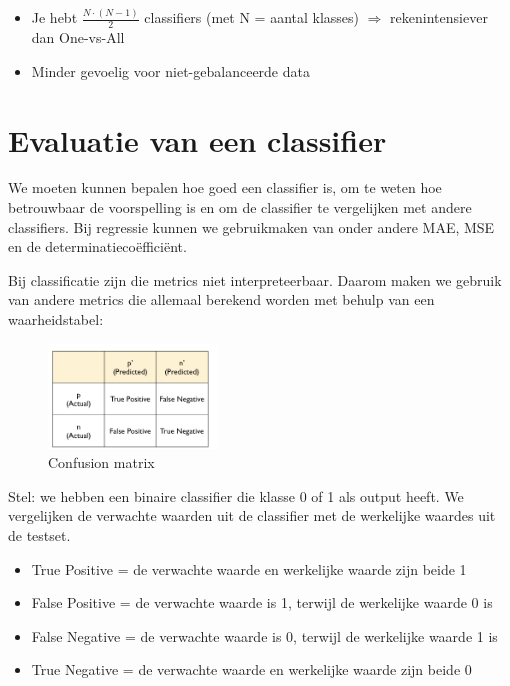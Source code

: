 \documentclass{article}
\begin{document}
\begin{itemize}
    \item Je hebt $\frac{N\cdot(N-1)}{2}$ classifiers (met N = aantal klasses) $\Rightarrow$ rekenintensiever dan One-vs-All
    \item Minder gevoelig voor niet-gebalanceerde data
\end{itemize}

\section{Evaluatie van een classifier}

We moeten kunnen bepalen hoe goed een classifier is, om te weten hoe betrouwbaar de voorspelling is
en om de classifier te vergelijken met andere classifiers. 
Bij regressie kunnen we gebruikmaken van onder andere MAE, MSE en de determinatiecoëfficiënt.
 
Bij classificatie zijn die metrics niet interpreteerbaar. 
Daarom maken we gebruik van andere metrics die allemaal berekend worden met behulp van een waarheidstabel:

\begin{figure}[H]
    \centering
    \includegraphics[width=0.4\textwidth]{truth-table.png}
    \caption{Confusion matrix}
\end{figure}

Stel: we hebben een binaire classifier die klasse 0 of 1 als output heeft.
We vergelijken de verwachte waarden uit de classifier met de werkelijke waardes uit de testset.

\begin{itemize}
    \item True Positive = de verwachte waarde en werkelijke waarde zijn beide 1
    \item False Positive = de verwachte waarde is 1, terwijl de werkelijke waarde 0 is
    \item False Negative = de verwachte waarde is 0, terwijl de werkelijke waarde 1 is
    \item True Negative = de verwachte waarde en werkelijke waarde zijn beide 0
\end{itemize}
\end{document}

